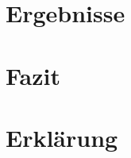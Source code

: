\documentclass[12pt,a4paper]{scrartcl}
\begin{document}
\section{Ergebnisse}\label{sec:Ergebnisse}

%
%
%
\newpage
\section{Fazit}\label{sec:Fazit}

%
%
%
\newpage
\section*{Erklärung}

%
%
%
\newpage

%
%
%
%
\end{document}
